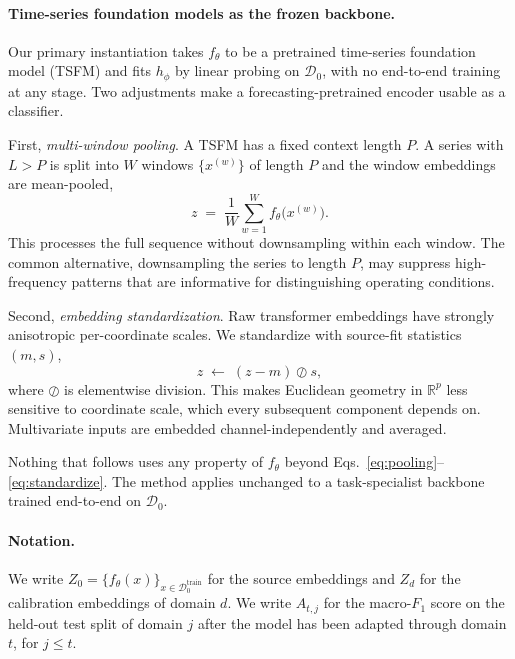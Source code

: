 \documentclass[letterpaper]{article} %
\begin{document}
\paragraph{Time-series foundation models as the frozen backbone.}
Our primary instantiation takes $f_\theta$ to be a pretrained time-series
foundation model (TSFM) and fits $h_\phi$ by linear probing on $\mathcal{D}_0$,
with no end-to-end training at any stage. Two adjustments make a
forecasting-pretrained encoder usable as a classifier.

First, \emph{multi-window pooling}. A TSFM has a fixed context length $P$. A
series with $L>P$ is split into $W$ windows $\{x^{(w)}\}$ of length $P$ and the
window embeddings are mean-pooled,
\begin{equation}
z \;=\; \frac{1}{W}\sum_{w=1}^{W}f_\theta\big(x^{(w)}\big).
\label{eq:pooling}
\end{equation}
This processes the full sequence without downsampling within each window. The
common alternative, downsampling the series to length $P$, may suppress
high-frequency patterns that are informative for distinguishing operating
conditions.

Second, \emph{embedding standardization}. Raw transformer embeddings have
strongly anisotropic per-coordinate scales. We standardize with source-fit
statistics $(m,s)$,
\begin{equation}
z \;\leftarrow\; (z-m)\oslash s ,
\label{eq:standardize}
\end{equation}
where $\oslash$ is elementwise division. This makes Euclidean geometry in
$\mathbb{R}^{p}$ less sensitive to coordinate scale, which every subsequent
component depends on.
Multivariate inputs are embedded channel-independently and averaged.

Nothing that follows uses any property of $f_\theta$ beyond
Eqs.~\eqref{eq:pooling}--\eqref{eq:standardize}. The method applies unchanged to
a task-specialist backbone trained end-to-end on $\mathcal{D}_0$.

\paragraph{Notation.}
We write $Z_0=\{f_\theta(x)\}_{x\in\mathcal{D}_0^{\mathrm{train}}}$ for the source embeddings and
$Z_d$ for the calibration embeddings of domain $d$. We write $A_{t,j}$ for the
macro-$F_1$ score on the held-out test split of domain $j$ after the model has
been adapted through domain $t$, for $j\le t$.

\end{document}
